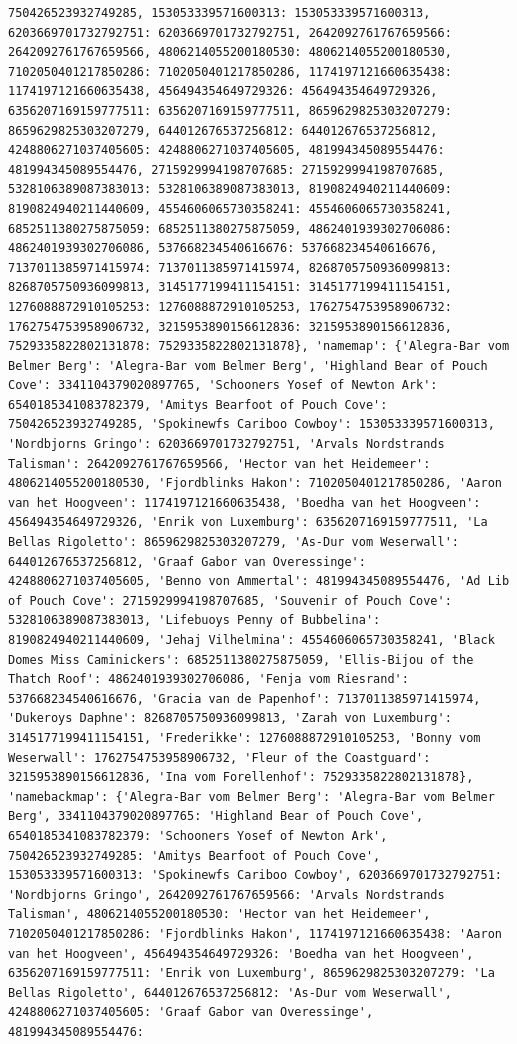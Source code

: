 \documentclass[
  letterpaper,
  DIV=11,
  numbers=noendperiod]{scrreprt}
\begin{document}
\begin{codelisting}
{\begin{verbatim}
750426523932749285, 153053339571600313: 153053339571600313, 6203669701732792751: 6203669701732792751, 2642092761767659566: 2642092761767659566, 4806214055200180530: 4806214055200180530, 7102050401217850286: 7102050401217850286, 1174197121660635438: 1174197121660635438, 456494354649729326: 456494354649729326, 6356207169159777511: 6356207169159777511, 8659629825303207279: 8659629825303207279, 644012676537256812: 644012676537256812, 4248806271037405605: 4248806271037405605, 481994345089554476: 481994345089554476, 2715929994198707685: 2715929994198707685, 5328106389087383013: 5328106389087383013, 8190824940211440609: 8190824940211440609, 4554606065730358241: 4554606065730358241, 6852511380275875059: 6852511380275875059, 4862401939302706086: 4862401939302706086, 537668234540616676: 537668234540616676, 7137011385971415974: 7137011385971415974, 8268705750936099813: 8268705750936099813, 3145177199411154151: 3145177199411154151, 1276088872910105253: 1276088872910105253, 1762754753958906732: 1762754753958906732, 3215953890156612836: 3215953890156612836, 7529335822802131878: 7529335822802131878}, 'namemap': {'Alegra-Bar vom Belmer Berg': 'Alegra-Bar vom Belmer Berg', 'Highland Bear of Pouch Cove': 3341104379020897765, 'Schooners Yosef of Newton Ark': 6540185341083782379, 'Amitys Bearfoot of Pouch Cove': 750426523932749285, 'Spokinewfs Cariboo Cowboy': 153053339571600313, 'Nordbjorns Gringo': 6203669701732792751, 'Arvals Nordstrands Talisman': 2642092761767659566, 'Hector van het Heidemeer': 4806214055200180530, 'Fjordblinks Hakon': 7102050401217850286, 'Aaron van het Hoogveen': 1174197121660635438, 'Boedha van het Hoogveen': 456494354649729326, 'Enrik von Luxemburg': 6356207169159777511, 'La Bellas Rigoletto': 8659629825303207279, 'As-Dur vom Weserwall': 644012676537256812, 'Graaf Gabor van Overessinge': 4248806271037405605, 'Benno von Ammertal': 481994345089554476, 'Ad Lib of Pouch Cove': 2715929994198707685, 'Souvenir of Pouch Cove': 5328106389087383013, 'Lifebuoys Penny of Bubbelina': 8190824940211440609, 'Jehaj Vilhelmina': 4554606065730358241, 'Black Domes Miss Caminickers': 6852511380275875059, 'Ellis-Bijou of the Thatch Roof': 4862401939302706086, 'Fenja vom Riesrand': 537668234540616676, 'Gracia van de Papenhof': 7137011385971415974, 'Dukeroys Daphne': 8268705750936099813, 'Zarah von Luxemburg': 3145177199411154151, 'Frederikke': 1276088872910105253, 'Bonny vom Weserwall': 1762754753958906732, 'Fleur of the Coastguard': 3215953890156612836, 'Ina vom Forellenhof': 7529335822802131878}, 'namebackmap': {'Alegra-Bar vom Belmer Berg': 'Alegra-Bar vom Belmer Berg', 3341104379020897765: 'Highland Bear of Pouch Cove', 6540185341083782379: 'Schooners Yosef of Newton Ark', 750426523932749285: 'Amitys Bearfoot of Pouch Cove', 153053339571600313: 'Spokinewfs Cariboo Cowboy', 6203669701732792751: 'Nordbjorns Gringo', 2642092761767659566: 'Arvals Nordstrands Talisman', 4806214055200180530: 'Hector van het Heidemeer', 7102050401217850286: 'Fjordblinks Hakon', 1174197121660635438: 'Aaron van het Hoogveen', 456494354649729326: 'Boedha van het Hoogveen', 6356207169159777511: 'Enrik von Luxemburg', 8659629825303207279: 'La Bellas Rigoletto', 644012676537256812: 'As-Dur vom Weserwall', 4248806271037405605: 'Graaf Gabor van Overessinge', 481994345089554476: 
\end{verbatim}}
\end{codelisting}
\end{document}
